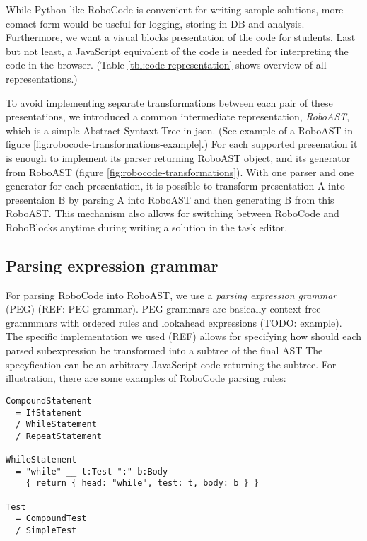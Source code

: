 While Python-like RoboCode is convenient for writing sample solutions,
more comact form would be useful for logging, storing in DB and analysis.
Furthermore, we want a visual blocks presentation of the code for students.
Last but not least, a JavaScript equivalent of the code is needed for
interpreting the code in the browser.
(Table \ref{tbl:code-representation} shows overview of all representations.)

To avoid implementing separate transformations between each pair of these
presentations, we introduced a common intermediate representation,
\emph{RoboAST}, which is a simple Abstract Syntaxt Tree in json.
(See example of a RoboAST in figure \ref{fig:robocode-transformations-example}.)
For each supported presenation it is enough to implement
its parser returning RoboAST object, and
its generator from RoboAST (figure \ref{fig:robocode-transformations}).
With one parser and one generator for each presentation,
it is possible to transform presentation A
into presentaion B by parsing A into RoboAST and
then generating B from this RoboAST.
This mechanism also allows for switching between RoboCode and RoboBlocks
anytime during writing a solution in the task editor.




\subsection{Parsing expression grammar}

For parsing RoboCode into RoboAST, we use a \emph{parsing expression grammar}
(PEG) (REF: PEG grammar).
PEG grammars are basically context-free grammmars with ordered rules
and lookahead expressions (TODO: example).
The specific implementation we used (REF) allows for specifying how should each
parsed subexpression be transformed into a subtree of the final AST
The specyfication can be an arbitrary JavaScript code returning the subtree.
For illustration, there are some examples of RoboCode parsing rules:

\begin{lstlisting}
CompoundStatement
  = IfStatement
  / WhileStatement
  / RepeatStatement

WhileStatement
  = "while" __ t:Test ":" b:Body
    { return { head: "while", test: t, body: b } }

Test
  = CompoundTest
  / SimpleTest
\end{lstlisting}

